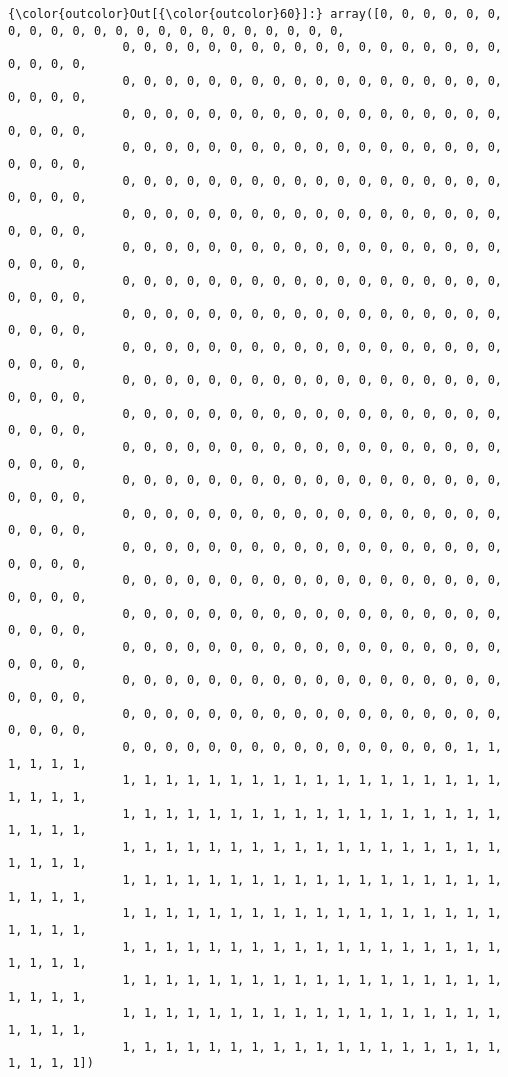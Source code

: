 \documentclass[11pt]{article}
\begin{document}
\begin{Verbatim}[commandchars=\\\{\}]
{\color{outcolor}Out[{\color{outcolor}60}]:} array([0, 0, 0, 0, 0, 0, 0, 0, 0, 0, 0, 0, 0, 0, 0, 0, 0, 0, 0, 0, 0, 0,
                0, 0, 0, 0, 0, 0, 0, 0, 0, 0, 0, 0, 0, 0, 0, 0, 0, 0, 0, 0, 0, 0,
                0, 0, 0, 0, 0, 0, 0, 0, 0, 0, 0, 0, 0, 0, 0, 0, 0, 0, 0, 0, 0, 0,
                0, 0, 0, 0, 0, 0, 0, 0, 0, 0, 0, 0, 0, 0, 0, 0, 0, 0, 0, 0, 0, 0,
                0, 0, 0, 0, 0, 0, 0, 0, 0, 0, 0, 0, 0, 0, 0, 0, 0, 0, 0, 0, 0, 0,
                0, 0, 0, 0, 0, 0, 0, 0, 0, 0, 0, 0, 0, 0, 0, 0, 0, 0, 0, 0, 0, 0,
                0, 0, 0, 0, 0, 0, 0, 0, 0, 0, 0, 0, 0, 0, 0, 0, 0, 0, 0, 0, 0, 0,
                0, 0, 0, 0, 0, 0, 0, 0, 0, 0, 0, 0, 0, 0, 0, 0, 0, 0, 0, 0, 0, 0,
                0, 0, 0, 0, 0, 0, 0, 0, 0, 0, 0, 0, 0, 0, 0, 0, 0, 0, 0, 0, 0, 0,
                0, 0, 0, 0, 0, 0, 0, 0, 0, 0, 0, 0, 0, 0, 0, 0, 0, 0, 0, 0, 0, 0,
                0, 0, 0, 0, 0, 0, 0, 0, 0, 0, 0, 0, 0, 0, 0, 0, 0, 0, 0, 0, 0, 0,
                0, 0, 0, 0, 0, 0, 0, 0, 0, 0, 0, 0, 0, 0, 0, 0, 0, 0, 0, 0, 0, 0,
                0, 0, 0, 0, 0, 0, 0, 0, 0, 0, 0, 0, 0, 0, 0, 0, 0, 0, 0, 0, 0, 0,
                0, 0, 0, 0, 0, 0, 0, 0, 0, 0, 0, 0, 0, 0, 0, 0, 0, 0, 0, 0, 0, 0,
                0, 0, 0, 0, 0, 0, 0, 0, 0, 0, 0, 0, 0, 0, 0, 0, 0, 0, 0, 0, 0, 0,
                0, 0, 0, 0, 0, 0, 0, 0, 0, 0, 0, 0, 0, 0, 0, 0, 0, 0, 0, 0, 0, 0,
                0, 0, 0, 0, 0, 0, 0, 0, 0, 0, 0, 0, 0, 0, 0, 0, 0, 0, 0, 0, 0, 0,
                0, 0, 0, 0, 0, 0, 0, 0, 0, 0, 0, 0, 0, 0, 0, 0, 0, 0, 0, 0, 0, 0,
                0, 0, 0, 0, 0, 0, 0, 0, 0, 0, 0, 0, 0, 0, 0, 0, 0, 0, 0, 0, 0, 0,
                0, 0, 0, 0, 0, 0, 0, 0, 0, 0, 0, 0, 0, 0, 0, 0, 0, 0, 0, 0, 0, 0,
                0, 0, 0, 0, 0, 0, 0, 0, 0, 0, 0, 0, 0, 0, 0, 0, 0, 0, 0, 0, 0, 0,
                0, 0, 0, 0, 0, 0, 0, 0, 0, 0, 0, 0, 0, 0, 0, 0, 0, 0, 0, 0, 0, 0,
                0, 0, 0, 0, 0, 0, 0, 0, 0, 0, 0, 0, 0, 0, 0, 0, 1, 1, 1, 1, 1, 1,
                1, 1, 1, 1, 1, 1, 1, 1, 1, 1, 1, 1, 1, 1, 1, 1, 1, 1, 1, 1, 1, 1,
                1, 1, 1, 1, 1, 1, 1, 1, 1, 1, 1, 1, 1, 1, 1, 1, 1, 1, 1, 1, 1, 1,
                1, 1, 1, 1, 1, 1, 1, 1, 1, 1, 1, 1, 1, 1, 1, 1, 1, 1, 1, 1, 1, 1,
                1, 1, 1, 1, 1, 1, 1, 1, 1, 1, 1, 1, 1, 1, 1, 1, 1, 1, 1, 1, 1, 1,
                1, 1, 1, 1, 1, 1, 1, 1, 1, 1, 1, 1, 1, 1, 1, 1, 1, 1, 1, 1, 1, 1,
                1, 1, 1, 1, 1, 1, 1, 1, 1, 1, 1, 1, 1, 1, 1, 1, 1, 1, 1, 1, 1, 1,
                1, 1, 1, 1, 1, 1, 1, 1, 1, 1, 1, 1, 1, 1, 1, 1, 1, 1, 1, 1, 1, 1,
                1, 1, 1, 1, 1, 1, 1, 1, 1, 1, 1, 1, 1, 1, 1, 1, 1, 1, 1, 1, 1, 1,
                1, 1, 1, 1, 1, 1, 1, 1, 1, 1, 1, 1, 1, 1, 1, 1, 1, 1, 1, 1, 1, 1])
\end{Verbatim}
            
\end{document}
